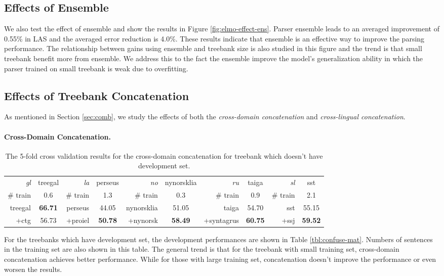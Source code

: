\documentclass[11pt,a4paper]{article}
\begin{document}
\subsection{Effects of Ensemble}

We also test the effect of ensemble and show
the results in Figure \ref{fig:elmo-effect-ens}.
Parser ensemble leads to an averaged improvement of 0.55\% in LAS
and the averaged error reduction is 4.0\%.
These results indicate that ensemble is an effective way to
improve the parsing performance.
The relationship between gains using ensemble and treebank size
is also studied in this figure and the trend is that small treebank benefit more
from ensemble.
We address this to the fact the ensemble improve the model's generalization
ability in which the parser trained on small treebank is weak due to overfitting.

\subsection{Effects of Treebank Concatenation}\label{sec:treebank-concat}
As mentioned in Section \ref{sec:comb},
we study the effects of both the \textit{cross-domain concatenation} and \textit{cross-lingual concatenation}.
\paragraph{Cross-Domain Concatenation.}


\begin{table}[t]
	\centering
	\small
	\begin{tabular}{rc || rc || rc || rc || rc}
		\textit{gl} & treegal & \textit{la} & perseus & \textit{no} & nynorsklia & \textit{ru} & taiga & \textit{sl} & sst \\
		\# train & 0.6 & \# train & 1.3 & \# train & 0.3 & \# train & 0.9 & \# train & 2.1 \\
		\hline
		treegal & \textbf{66.71} & perseus & 44.05 & nynorsklia & 51.05 & taiga & 54.70 & sst & 55.15 \\
		+ctg & 56.73 & +proiel & \textbf{50.78} & +nynorsk & \textbf{58.49} & +syntagrus & \textbf{60.75} & +ssj & \textbf{59.52} \\
	\end{tabular}
	\caption{The 5-fold cross validation results for the cross-domain concatenation for treebank which doesn't have development set.}\label{tbl:confuse-mat2}
\end{table}

For the treebanks which have development set, the development performances
are shown in Table \ref{tbl:confuse-mat}.
Numbers of sentences in the training set are also shown in this table.
The general trend is that for the treebank with small training set,
cross-domain concatenation achieves better performance.
While for those with large training set, concatenation doesn't improve
the performance or even worsen the results.
\end{document}
